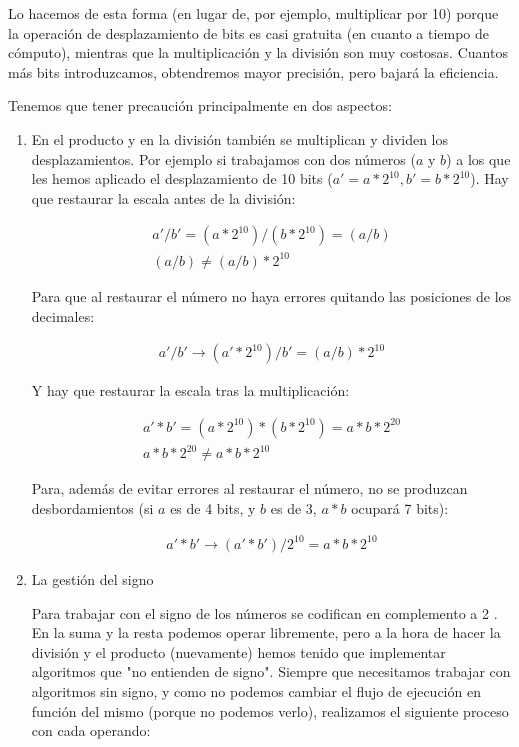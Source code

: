 Lo hacemos de esta forma (en lugar de, por ejemplo, multiplicar por 10) porque la operación de desplazamiento de bits es casi gratuita (en cuanto a tiempo de cómputo), mientras que la multiplicación y la división son muy costosas. Cuantos más bits introduzcamos, obtendremos mayor precisión, pero bajará la eficiencia.

Tenemos que tener precaución principalmente en dos aspectos:

\begin{enumerate}

  \item En el producto y en la división también se multiplican y dividen los desplazamientos. Por ejemplo si trabajamos con dos números ($a$ y $b$) a los que les hemos aplicado el desplazamiento de 10 bits ($ a' = a * 2^{10}, b' = b * 2^{10} $). Hay que restaurar la escala antes de la división:

  \begin{gather}
    \label{form:float_bits_product}
    a' / b' = ( a * 2^{10} ) / ( b * 2^{10} ) = (a / b) \\
    (a / b) \neq (a / b) * 2^{10}
  \end{gather}

  Para que al restaurar el número no haya errores quitando las posiciones de los decimales:

  \begin{gather}
    a' / b' \rightarrow (a' * 2^{10})/b' = (a / b) * 2^{10}
  \end{gather}

  Y hay que restaurar la escala tras la multiplicación:

  \begin{gather}
    a' * b' = ( a * 2^{10} ) * ( b * 2^{10} ) = a * b * 2^{20} \\
    a * b * 2^{20} \neq a * b * 2^{10}
  \end{gather}

  Para, además de evitar errores al restaurar el número, no se produzcan desbordamientos (si $a$ es de 4 bits, y $b$ es de 3, $ a * b $ ocupará 7 bits):

  \begin{gather}
    a' * b' \rightarrow (a' * b') / 2^{10} = a * b * 2^{10}
  \end{gather}

  \item La gestión del signo

  Para trabajar con el signo de los números se codifican en complemento a 2 \cite{complemento_a_2}. En la suma y la resta podemos operar libremente, pero a la hora de hacer la división y el producto (nuevamente) hemos tenido que implementar algoritmos que "no entienden de signo".  Siempre que necesitamos trabajar con algoritmos sin signo, y como no podemos cambiar el flujo de ejecución en función del mismo (porque no podemos verlo), realizamos el siguiente proceso con cada operando:


\end{enumerate}
